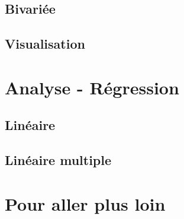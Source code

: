 \documentclass[10.5pt,a4paper]{article}
\begin{document}
  \subsection{Bivariée}
  \subsection{Visualisation}


\section{Analyse - Régression}
  \subsection{Linéaire}
  \subsection{Linéaire multiple}

  
\section{Pour aller plus loin}\label{further}
 
%
%
\end{document}
